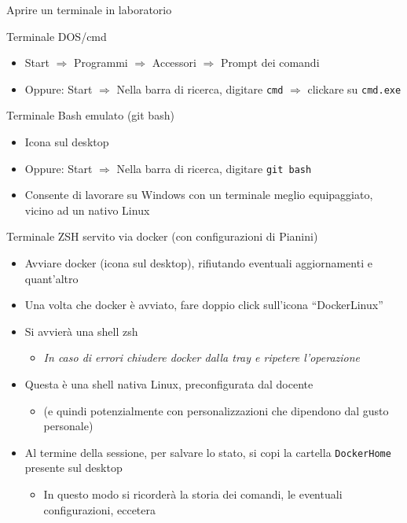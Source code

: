 \documentclass[presentation]{beamer}
\begin{document}
\begin{frame}{Aprire un terminale in laboratorio}
    \begin{block}{Terminale DOS/cmd}
        \begin{itemize}
            \item Start $\Rightarrow$ Programmi $\Rightarrow$ Accessori $\Rightarrow$ Prompt dei comandi
            \item Oppure: Start  $\Rightarrow$ Nella barra di ricerca, digitare \texttt{cmd} $\Rightarrow$ clickare su \texttt{cmd.exe}
        \end{itemize}
    \end{block}
    \begin{block}{Terminale Bash emulato (git bash)}
        \begin{itemize}
            \item Icona sul desktop
            \item Oppure: Start  $\Rightarrow$ Nella barra di ricerca, digitare \texttt{git bash}
            \item Consente di lavorare su Windows con un terminale meglio equipaggiato, vicino ad un nativo Linux
        \end{itemize}
    \end{block}
    \begin{block}{Terminale ZSH servito via docker (con configurazioni di Pianini)}
        \begin{itemize}
            \item Avviare docker (icona sul desktop), rifiutando eventuali aggiornamenti e quant'altro
            \item Una volta che docker è avviato, fare doppio click sull'icona ``DockerLinux''
            \item Si avvierà una shell zsh
            \begin{itemize}
                \item \emph{In caso di errori chiudere docker dalla tray e ripetere l'operazione}
            \end{itemize}
            \item Questa è una shell nativa Linux, preconfigurata dal docente
            \begin{itemize}
                \item (e quindi potenzialmente con personalizzazioni che dipendono dal gusto personale)
            \end{itemize}
            \item Al termine della sessione, per salvare lo stato, si copi la cartella \texttt{DockerHome} presente sul desktop
            \begin{itemize}
                \item In questo modo si ricorderà la storia dei comandi, le eventuali configurazioni, eccetera
            \end{itemize}
        \end{itemize}
    \end{block}
\end{frame}
\end{document}

